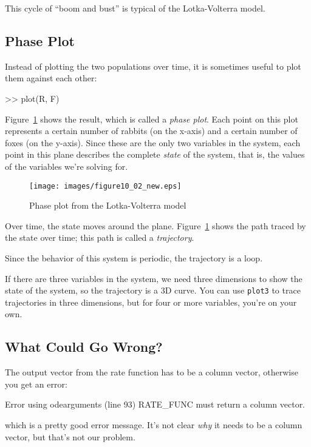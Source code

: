 This cycle of ``boom and bust'' is typical of the Lotka-Volterra model.


\subsection{Phase Plot}

Instead of plotting the two populations over time, it is sometimes useful to plot them against each other:

\begin{code}
>> plot(R, F)
\end{code}

Figure~\ref{fig:phase} shows the result, which is called a \emph{phase plot}.
Each point on this plot represents a certain number of rabbits (on the
x-axis) and a certain number of foxes (on the y-axis).
Since these are the only two variables in the system, each point in
this plane describes the complete \emph{state} of the system, that is, the values of
the variables we're solving for.

\begin{figure}[ht]
\centerline{\texttt{[image: images/figure10\_02\_new.eps]}}
\caption{Phase plot from the Lotka-Volterra model}
\label{fig:phase}
\end{figure}


Over time, the state moves around the plane. Figure~\ref{fig:phase} shows
the path traced by the state over time; this path
is called a \emph{trajectory}.

Since the behavior of this system is periodic, the trajectory is a loop.

If there are three variables in the system, we need three dimensions to show
the state of the system, so the trajectory is a 3D curve.
You can use \lstinline{plot3} to trace trajectories in three dimensions,
but for four or more variables, you're on your own.



\subsection{What Could Go Wrong?}

The output vector from the rate function has to be a column vector, otherwise you get an error:

\begin{code}
Error using odearguments (line 93)
RATE_FUNC must return a column vector.
\end{code}
which is a pretty good error message.  It's not clear \emph{why}
it needs to be a column vector, but that's not our problem.

